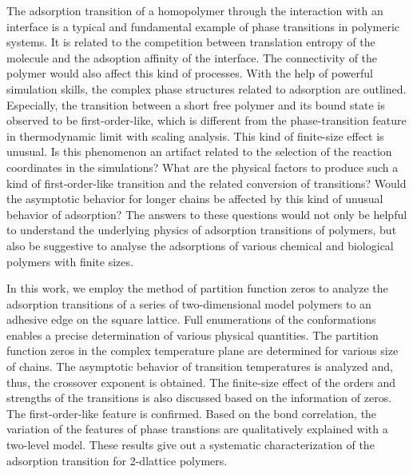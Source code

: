 \documentclass[aps,pre,twocolumn,showpacs,preprintnumbers,amsmath,amssymb]{revtex4-1}
\begin{document}
The adsorption transition of a homopolymer through the
interaction with an interface is a typical and fundamental
example of phase transitions in polymeric
systems\cite{LifshitzRMP78,deGennesBook79,PhysRep, PCCP10,
JCP09,JCP09b,JCP10,PRL95,BinderBook95}. It is related to the
competition between translation entropy of the molecule and the
adsoption affinity of the interface. The connectivity of the
polymer would also affect this kind of processes. With the help
of powerful simulation skills, the complex phase structures
related to adsorption are outlined\cite{PCCP10,
JCP09,JCP09b,JCP10,JCP08,Pull09}. Especially, the transition
between a short free polymer and its bound state is observed to
be first-order-like, which is different from the
phase-transition feature in thermodynamic limit with scaling
analysis. This kind of finite-size effect is unusual. Is this
phenomenon an artifact related to the selection of the reaction
coordinates in the simulations? What are the physical factors to
produce such a kind of first-order-like transition and the
related conversion of transitions? Would the asymptotic behavior
for longer chains be affected by this kind of unusual behavior
of adsorption? The answers to these questions would not only be
helpful to understand the underlying physics of adsorption
transitions of polymers, but also be suggestive to analyse the
adsorptions of various chemical and biological polymers with
finite sizes.

In this work, we employ the method of partition function zeros
to analyze the adsorption transitions of a series of
two-dimensional model polymers to an adhesive edge on the square
lattice. Full enumerations of the conformations enables a
precise determination of various physical quantities. The
partition function zeros in the complex temperature plane are
determined for various size of chains. The asymptotic behavior
of transition temperatures is analyzed and, thus, the crossover
exponent is obtained. The finite-size effect of the orders and
strengths of the transitions is also discussed based on the
information of zeros. The first-order-like feature is confirmed.
Based on the bond correlation, the variation of the features of
phase transtions are qualitatively explained with a two-level
model. These results give out a systematic characterization of
the adsorption transition for 2-dlattice polymers.

\end{document}
